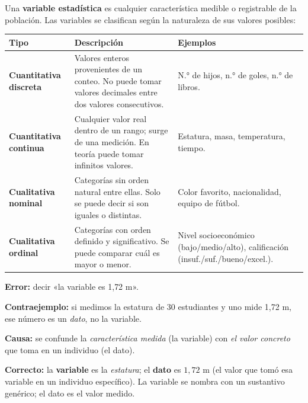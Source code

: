 \documentclass[11pt, letterpaper]{article}
\begin{document}
\begin{tcolorbox}[importantbox, title={Clasificación de variables}]
Una \textbf{variable estadística} es cualquier característica medible o registrable de la población. Las variables se clasifican según la naturaleza de sus valores posibles:

\medskip
\begin{center}
\renewcommand{\arraystretch}{1.35}
\begin{tabular}{p{3cm} p{4.5cm} p{4.5cm}}
\toprule
\textbf{Tipo} & \textbf{Descripción} & \textbf{Ejemplos}\\
\midrule
\textbf{Cuantitativa discreta} & Valores enteros provenientes de un conteo. No puede tomar valores decimales entre dos valores consecutivos. & N.° de hijos, n.° de goles, n.° de libros.\\[4pt]
\textbf{Cuantitativa continua} & Cualquier valor real dentro de un rango; surge de una medición. En teoría puede tomar infinitos valores. & Estatura, masa, temperatura, tiempo.\\[4pt]
\textbf{Cualitativa nominal} & Categorías sin orden natural entre ellas. Solo se puede decir si son iguales o distintas. & Color favorito, nacionalidad, equipo de fútbol.\\[4pt]
\textbf{Cualitativa ordinal} & Categorías con orden definido y significativo. Se puede comparar cuál es mayor o menor. & Nivel socioeconómico (bajo/medio/alto), calificación (insuf./suf./bueno/excel.).\\
\bottomrule
\end{tabular}
\end{center}
\end{tcolorbox}

\begin{tcolorbox}[warningbox, title={Error frecuente: confundir variable con dato}]
\textbf{Error:} decir «la variable es 1{,}72 m».

\medskip
\textbf{Contraejemplo:} si medimos la estatura de 30 estudiantes y uno mide 1{,}72 m, ese número es un \textit{dato}, no la variable.

\medskip
\textbf{Causa:} se confunde la \textit{característica medida} (la variable) con \textit{el valor concreto} que toma en un individuo (el dato).

\medskip
\textbf{Correcto:} la \textbf{variable} es la \textit{estatura}; el \textbf{dato} es $1{,}72$ m (el valor que tomó esa variable en un individuo específico). La variable se nombra con un sustantivo genérico; el dato es el valor medido.
\end{tcolorbox}
\end{document}
